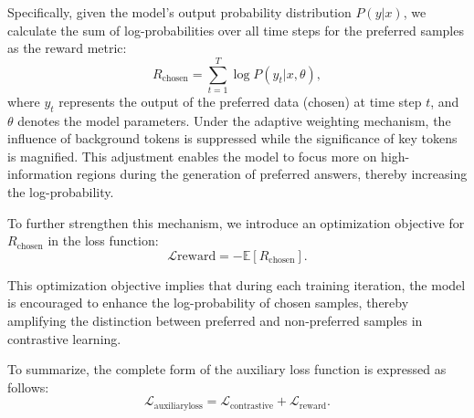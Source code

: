 Specifically, given the model’s output probability distribution $P(y | x)$, we calculate the sum of log-probabilities over all time steps for the preferred samples as the reward metric:
\begin{equation}
R_{\text{chosen}} = \sum_{t=1}^T \log P(y_t | x, \theta),
\end{equation}
where $y_t$ represents the output of the preferred data (chosen) at time step $t$, and $\theta$ denotes the model parameters. Under the adaptive weighting mechanism, the influence of background tokens is suppressed while the significance of key tokens is magnified. This adjustment enables the model to focus more on high-information regions during the generation of preferred answers, thereby increasing the log-probability.

To further strengthen this mechanism, we introduce an optimization objective for $R_{\text{chosen}}$ in the loss function:
\begin{equation}
\mathcal{L}{\text{reward}} = -\mathbb{E}[R_{\text{chosen}}].
\end{equation}

This optimization objective implies that during each training iteration, the model is encouraged to enhance the log-probability of chosen samples, thereby amplifying the distinction between preferred and non-preferred samples in contrastive learning.

To summarize, the complete form of the auxiliary loss function is expressed as follows:
\begin{equation}
\mathcal{L}_{\text{auxiliaryloss}} = \mathcal{L}_{\text{contrastive}} + \mathcal{L}_{\text{reward}}.
\end{equation}


